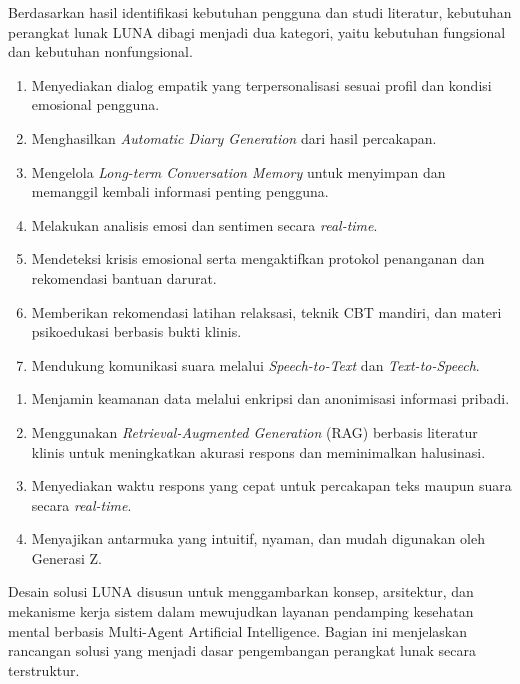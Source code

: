 
Berdasarkan hasil identifikasi kebutuhan pengguna dan studi literatur, kebutuhan perangkat lunak LUNA dibagi menjadi dua kategori, yaitu kebutuhan fungsional dan kebutuhan nonfungsional.

\begin{enumerate}[leftmargin=*,label=\alph*.]
    \item Menyediakan dialog empatik yang terpersonalisasi sesuai profil dan kondisi emosional pengguna.
    \item Menghasilkan \textit{Automatic Diary Generation} dari hasil percakapan.
    \item Mengelola \textit{Long-term Conversation Memory} untuk menyimpan dan memanggil kembali informasi penting pengguna.
    \item Melakukan analisis emosi dan sentimen secara \textit{real-time}.
    \item Mendeteksi krisis emosional serta mengaktifkan protokol penanganan dan rekomendasi bantuan darurat.
    \item Memberikan rekomendasi latihan relaksasi, teknik CBT mandiri, dan materi psikoedukasi berbasis bukti klinis.
    \item Mendukung komunikasi suara melalui \textit{Speech-to-Text} dan \textit{Text-to-Speech}.
\end{enumerate}

\begin{enumerate}[leftmargin=*,label=\alph*.]
    \item Menjamin keamanan data melalui enkripsi dan anonimisasi informasi pribadi.
    \item Menggunakan \textit{Retrieval-Augmented Generation} (RAG) berbasis literatur klinis untuk meningkatkan akurasi respons dan meminimalkan halusinasi.
    \item Menyediakan waktu respons yang cepat untuk percakapan teks maupun suara secara \textit{real-time}.
    \item Menyajikan antarmuka yang intuitif, nyaman, dan mudah digunakan oleh Generasi Z.
\end{enumerate}

Desain solusi LUNA disusun untuk menggambarkan konsep, arsitektur, dan mekanisme kerja sistem dalam mewujudkan layanan pendamping kesehatan mental berbasis Multi-Agent Artificial Intelligence. Bagian ini menjelaskan rancangan solusi yang menjadi dasar pengembangan perangkat lunak secara terstruktur.

